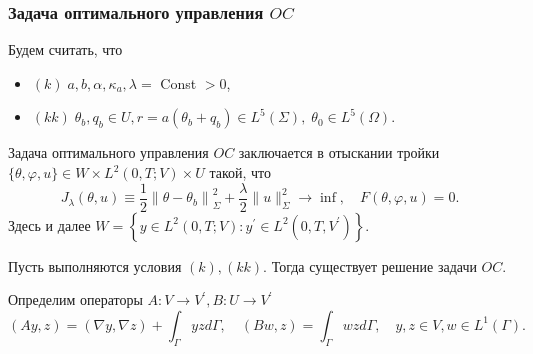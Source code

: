 \begin{frame}
    \frametitle{Задача оптимального управления $OC$}
    Будем считать, что
    \begin{itemize}
        \item $(k)\; a, b, \alpha, \kappa_{a}, \lambda=$ Const $>0$,
        \item $(kk)\; \theta_{b}, q_{b} \in U, r=a\left(\theta_{b}+q_{b}\right)
        \in L^{5}(\Sigma), \; \theta_{0} \in L^{5}(\Omega)$.
    \end{itemize}

    Задача оптимального управления $OC$ заключается в отыскании тройки
    $\{\theta, \varphi, u\} \in W \times L^{2}(0, T ; V) \times U$ такой, что
    \[
        J_{\lambda}(\theta, u) \equiv \frac{1}{2}\left\|\theta-
        \theta_{b}\right\|_{\Sigma}^{2}+
        \frac{\lambda}{2}\|u\|_{\Sigma}^{2}
        \rightarrow \inf, \quad F(\theta, \varphi, u)=0.
    \]
    Здесь и далее
    $
    W=\left\{y \in L^{2}(0, T ; V):y^{\prime}
    \in L^{2}\left(0, T, V^{\prime}\right)\right\}
    $.

    \begin{theorem}[2.6]
        \label{th:2_3:1}
        Пусть выполняются условия $(k), (kk)$.
        Тогда существует решение задачи $OC$.
    \end{theorem}
    Определим операторы $A: V \rightarrow V^{\prime}, B: U \rightarrow V^{\prime}$
    \[
        (A y, z)=(\nabla y, \nabla z)+\int_{\Gamma} y z d \Gamma,
        \quad(B w, z)=\int_{\Gamma} w z d \Gamma,\quad y, z \in V, w \in L^{1}(\Gamma).
    \]

\end{frame}

